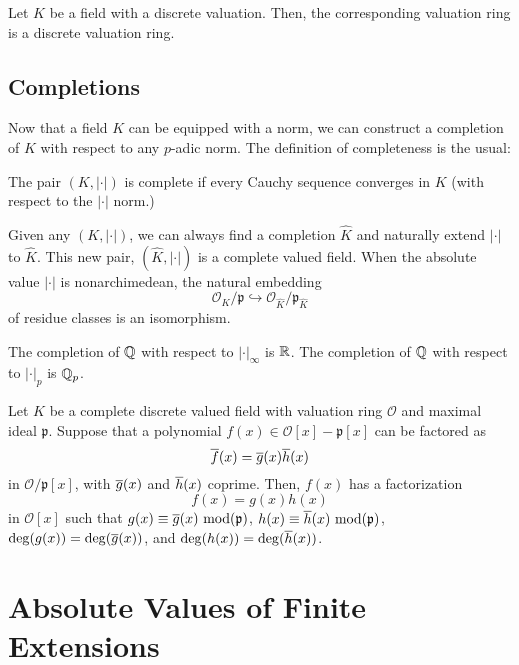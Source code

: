 \begin{proposition}
    Let $K$ be a field with a discrete valuation. Then, the corresponding valuation ring is a discrete valuation ring.
\end{proposition}

\subsection{Completions}

Now that a field $K$ can be equipped with a norm, we can construct a completion of $K$ with respect to any $p$-adic norm. The definition of completeness is the usual:

\begin{definition}[Complete]
    The pair $(K, |\cdot|)$ is complete if every Cauchy sequence converges in $K$ (with respect to the $|\cdot|$ norm.)
\end{definition}


Given any $(K, |\cdot|)$, we can always find a completion $\hat{K}$ and naturally extend $|\cdot|$ to $\hat{K}$. This new pair, $(\hat{K}, |\cdot|)$ is a complete valued field. When the absolute value $|\cdot|$ is nonarchimedean, the natural embedding
    \[\mathcal{O}_{K}/\mathfrak{p} \hookrightarrow \mathcal{O}_{\hat{K}}/\mathfrak{p}_{\hat{K}}\]
of residue classes is an isomorphism.

\begin{example}
    The completion of $\mathbb{Q}$ with respect to $|\cdot|_\infty$ is $\mathbb{R}$. The completion of $\mathbb{Q}$ with respect to $|\cdot|_p$ is $\mathbb{Q}_p$.
\end{example}

\begin{theorem}
    Let $K$ be a complete discrete valued field with valuation ring $\mathcal{O}$ and maximal ideal $\mathfrak{p}$. Suppose that a polynomial $f(x) \in \mathcal{O}[x] - \mathfrak{p}[x]$ can be factored as
        \[\overline{f}(x) = \overline{g}(x)\overline{h}(x)\]
    in $\mathcal{O}/\mathfrak{p}[x]$, with $\overline{g}(x)$ and $\overline{h}(x)$ coprime. Then, $f(x)$ has a factorization
        \[f(x) = g(x) h(x)\]
    in $\mathcal{O}[x]$ such that $g(x) \equiv \overline{g}(x) \textrm{ mod}(\mathfrak{p})$, $h(x) \equiv \overline{h}(x) \textrm{ mod}(\mathfrak{p})$, $\deg(g(x)) = \deg(\overline{g}(x))$, and $\deg(h(x)) = \deg(\overline{h}(x))$.
\end{theorem}

\section{Absolute Values of Finite Extensions}


